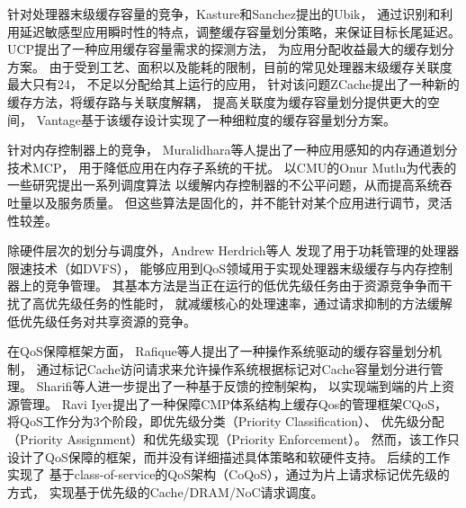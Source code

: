 针对处理器末级缓存容量的竞争，Kasture和Sanchez提出的Ubik\cite{kasture_ubik:_2014}，
通过识别和利用延迟敏感型应用瞬时性的特点，调整缓存容量划分策略，来保证目标长尾延迟。
UCP\cite{qureshi_utility-based_2006}提出了一种应用缓存容量需求的探测方法，
为应用分配收益最大的缓存划分方案。
由于受到工艺、面积以及能耗的限制，目前的常见处理器末级缓存关联度最大只有24，
不足以分配给其上运行的应用，
针对该问题ZCache\cite{sanchez_zcache:_2010}提出了一种新的缓存方法，将缓存路与关联度解耦，
提高关联度为缓存容量划分提供更大的空间，
Vantage\cite{sanchez_vantage:_2011}基于该缓存设计实现了一种细粒度的缓存容量划分方案。


针对内存控制器上的竞争，
Muralidhara等人提出了一种应用感知的内存通道划分技术MCP\cite{muralidhara_reducing_2011}，
用于降低应用在内存子系统的干扰。
以CMU的Onur Mutlu为代表的一些研究提出一系列调度算法\cite{mutlu_stall-time_2007,
mutlu_parallelism-aware_2008, kim_atlas:_2010, kim_thread_2010}
以缓解内存控制器的不公平问题，从而提高系统吞吐量以及服务质量。
但这些算法是固化的，并不能针对某个应用进行调节，灵活性较差。

除硬件层次的划分与调度外，Andrew Herdrich等人\cite{herdrich_rate-based_2009}
发现了用于功耗管理的处理器限速技术（如DVFS），
能够应用到QoS领域用于实现处理器末级缓存与内存控制器上的竞争管理。
其基本方法是当正在运行的低优先级任务由于资源竞争争而干扰了高优先级任务的性能时，
就减缓核心的处理速率，通过请求抑制的方法缓解低优先级任务对共享资源的竞争。

在QoS保障框架方面，
Rafique等人提出了一种操作系统驱动的缓存容量划分机制\cite{Rafique:2006:ASO}，
通过标记Cache访问请求来允许操作系统根据标记对Cache容量划分进行管理。
Sharifi等人进一步提出了一种基于反馈的控制架构\cite{sharifi_mete:_2011}，
以实现端到端的片上资源管理。
Ravi Iyer提出了一种保障CMP体系结构上缓存Qos的管理框架CQoS\cite{iyer_cqos:_2004}，
将QoS工作分为3个阶段，即优先级分类（Priority Classification）、
优先级分配（Priority Assignment）和优先级实现（Priority Enforcement）。
然而，该工作只设计了QoS保障的框架，而并没有详细描述具体策略和软硬件支持。
后续的工作\cite{iyer_qos_2007, li_coqos:_2011, li_dynamic_2012}实现了
基于class-of-service的QoS架构（CoQoS），通过为片上请求标记优先级的方式，
实现基于优先级的Cache/DRAM/NoC请求调度。

